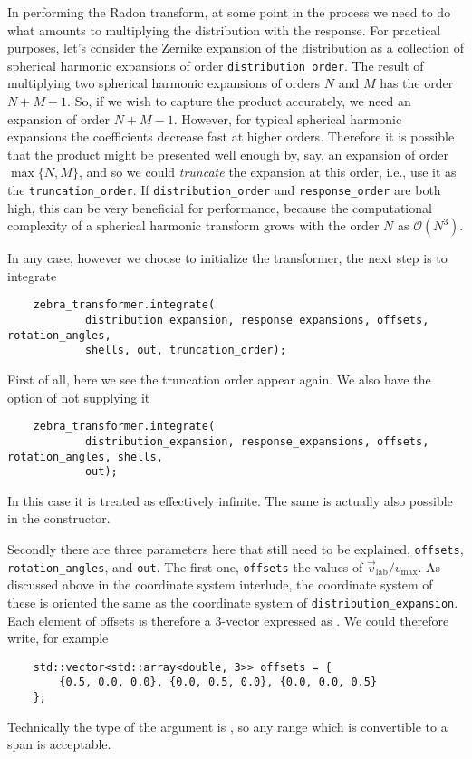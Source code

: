 \documentclass{article}
\begin{document}
In performing the Radon transform, at some point in the process we need to do what amounts to multiplying the distribution with the response. For practical purposes, let's consider the Zernike expansion of the distribution as a collection of spherical harmonic expansions of order \texttt{distribution\_order}. The result of multiplying two spherical harmonic expansions of orders $N$ and $M$ has the order $N + M - 1$. So, if we wish to capture the product accurately, we need an expansion of order $N + M - 1$. However, for typical spherical harmonic expansions the coefficients decrease fast at higher orders. Therefore it is possible that the product might be presented well enough by, say, an expansion of order $\max\{N,M\}$, and so we could \emph{truncate} the expansion at this order, i.e., use it as the \texttt{truncation\_order}. If \texttt{distribution\_order} and \texttt{response\_order} are both high, this can be very beneficial for performance, because the computational complexity of a spherical harmonic transform grows with the order $N$ as $\mathcal{O}(N^3)$.

In any case, however we choose to initialize the transformer, the next step is to integrate
\begin{verbatim}
    zebra_transformer.integrate(
            distribution_expansion, response_expansions, offsets, rotation_angles,
            shells, out, truncation_order);
\end{verbatim}
First of all, here we see the truncation order appear again. We also have the option of not supplying it
\begin{verbatim}
    zebra_transformer.integrate(
            distribution_expansion, response_expansions, offsets, rotation_angles, shells,
            out);
\end{verbatim}
In this case it is treated as effectively infinite. The same is actually also possible in the constructor.

Secondly there are three parameters here that still need to be explained, \texttt{offsets}, \texttt{rotation_angles}, and \texttt{out}. The first one, \texttt{offsets} the values of $\vec{v}_\text{lab}/v_\text{max}$. As discussed above in the coordinate system interlude, the coordinate system of these is oriented the same as the coordinate system of \texttt{distribution\_expansion}. Each element of offsets is therefore a 3-vector expressed as . We could therefore write, for example
\begin{verbatim}
    std::vector<std::array<double, 3>> offsets = {
        {0.5, 0.0, 0.0}, {0.0, 0.5, 0.0}, {0.0, 0.0, 0.5}
    };
\end{verbatim}
Technically the type of the argument is , so any range which is convertible to a span is acceptable.
\end{document}
